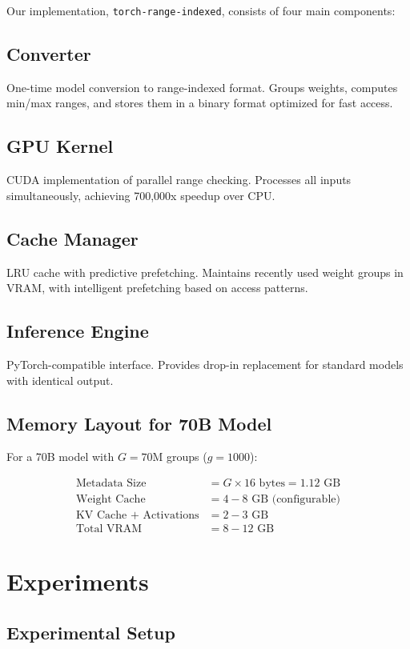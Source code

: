 \documentclass[twocolumn,10pt]{article}
\begin{document}
Our implementation, \texttt{torch-range-indexed}, consists of four main components:

\subsection{Converter}
One-time model conversion to range-indexed format. Groups weights, computes min/max ranges, and stores them in a binary format optimized for fast access.

\subsection{GPU Kernel}
CUDA implementation of parallel range checking. Processes all inputs simultaneously, achieving 700,000x speedup over CPU.

\subsection{Cache Manager}
LRU cache with predictive prefetching. Maintains recently used weight groups in VRAM, with intelligent prefetching based on access patterns.

\subsection{Inference Engine}
PyTorch-compatible interface. Provides drop-in replacement for standard models with identical output.

\subsection{Memory Layout for 70B Model}

For a 70B model with $G = 70\text{M}$ groups ($g = 1000$):

\begin{align}
\text{Metadata Size} &= G \times 16 \text{ bytes} = 1.12 \text{ GB} \\
\text{Weight Cache} &= 4-8 \text{ GB (configurable)} \\
\text{KV Cache + Activations} &= 2-3 \text{ GB} \\
\text{Total VRAM} &= 8-12 \text{ GB}
\end{align}

\section{Experiments}

\subsection{Experimental Setup}
\end{document}
